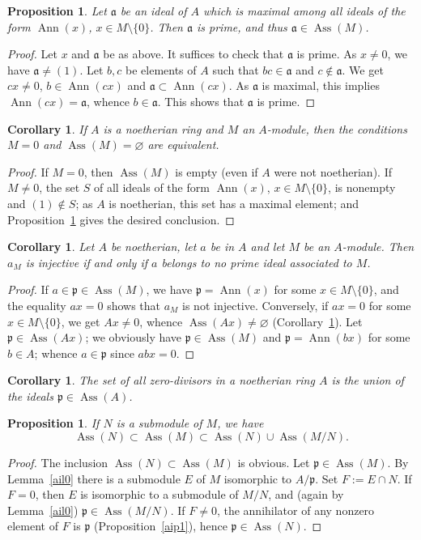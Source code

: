 \documentclass[parskip=half,fontsize=12pt]{scrartcl}%
\newcommand{\oo}{\operatorname}\newcommand{\ooo}{\operatorname*}
\newcommand{\mf}{\mathfrak}
\newcommand{\aaa}{\mf a}
\newcommand{\ppp}{\mf p}
\newcommand{\Ann}{\oo{Ann}}
\newcommand{\Ass}{\oo{Ass}}
\newtheorem{cor}[thm]{Corollary}
\newtheorem{prop}[thm]{Proposition}
\begin{document}
\begin{prop}\label{aip2}
Let $\aaa$ be an ideal of $A$ which is maximal among all ideals of the form $\Ann(x)$, $x\in M\setminus\{0\}$. Then $\aaa$ is prime, and thus $\aaa\in\Ass(M)$.
\end{prop}
\begin{proof}
Let $x$ and $\aaa$ %
be as above. %
It suffices to check that $\aaa$ is prime. As $x\ne0$, we have $\aaa\ne(1)$. Let $b,c$ be elements of $A$ such that $bc\in\aaa$ and $c\notin\aaa$. We get $cx\ne0$, $b\in\Ann(cx)$ and $\aaa\subset\Ann(cx)$. As $\aaa$ is maximal, this implies $\Ann(cx)=\aaa$, whence $b\in\aaa$. This shows that $\aaa$ is prime.
\end{proof}
\begin{cor}\label{iac1}
If $A$ is a noetherian ring and $M$ an $A$-module, then the conditions $M=0$ and $\Ass(M)=\varnothing$ are equivalent.
\end{cor}
\begin{proof}
If $M=0$, then $\Ass(M)$ is empty (even if $A$ were not noetherian). If $M\ne0$, the set $S$ of all ideals of the form $\Ann(x)$, $x\in M\setminus\{0\}$, is nonempty and $(1)\notin S$; as $A$ is noetherian, this set has a maximal element; and Proposition~\ref{aip2} gives the desired conclusion.
\end{proof}
\begin{cor} Let $A$ be noetherian, let $a$ be in $A$ and let $M$ be an $A$-module. Then $a_M$ is injective if and only if $a$ belongs to no prime ideal associated to $M$.
\end{cor}
\begin{proof}
If $a\in\ppp\in\Ass(M)$, we have $\ppp=\Ann(x)$ for some $x\in M\setminus\{0\}$, and the equality $ax=0$ shows that $a_M$ is not injective. Conversely, if $ax=0$ for some $x\in M\setminus\{0\}$, we get $Ax\ne0$, whence $\Ass(Ax)\ne\varnothing$ (Corollary~\ref{iac1}). Let $\ppp\in\Ass(Ax)$; we obviously have $\ppp\in\Ass(M)$ and $\ppp=\Ann(bx)$ for some $b\in A$; whence $a\in\ppp$ since $abx=0$. 
\end{proof}
\begin{cor}%
The set of all zero-divisors in a noetherian ring $A$ is the union of the ideals $\ppp\in\Ass(A)$.
\end{cor}
\begin{prop}\label{aip3}%
If $N$ is a submodule of $M$, we have 
$$
\Ass(N)\subset\Ass(M)\subset\Ass(N)\cup\Ass(M/N).
$$
\end{prop}
\begin{proof}
The inclusion $\Ass(N)\subset\Ass(M)$ is obvious. Let $\ppp\in\Ass(M)$. By Lemma~\ref{ail0} there is a submodule $E$ of $M$ isomorphic to $A/\ppp$. Set $F:=E\cap N$. If $F=0$, then $E$ is isomorphic to a submodule of $M/N$, and (again by Lemma~\ref{ail0}) $\ppp\in\Ass(M/N)$. If $F\ne0$, the annihilator of any nonzero element of $F$ is $\ppp$ (Proposition~\ref{aip1}), hence $\ppp\in\Ass(N)$.
\end{proof}
\end{document}
